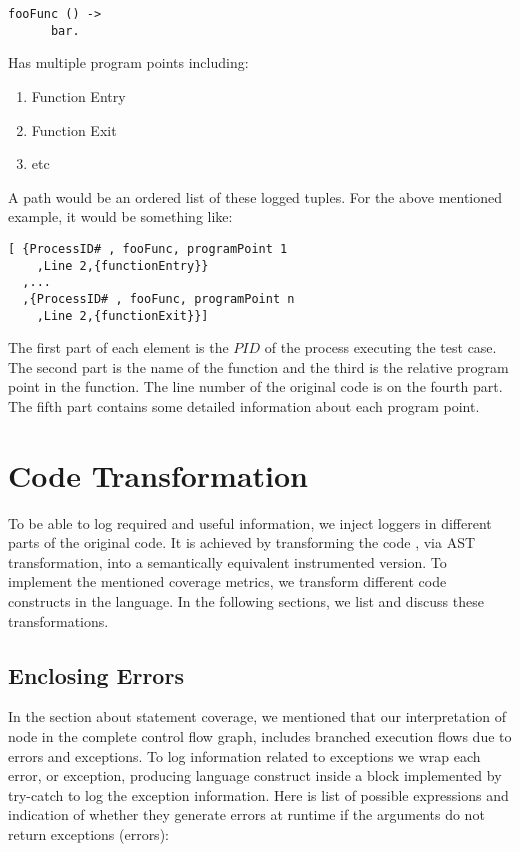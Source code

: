 \documentclass[12pt,a4paper]{report}
\begin{document}
\begin{lstlisting}
fooFunc () -> 
      bar.  
\end{lstlisting}

Has multiple program points including:

\begin{enumerate}
 \item Function Entry
 \item Function Exit
 \item etc
\end{enumerate}
 
A path would be an ordered list of these logged tuples. For the above mentioned example, it would be something like:

\begin{lstlisting}
[ {ProcessID# , fooFunc, programPoint 1
    ,Line 2,{functionEntry}}
  ,...
  ,{ProcessID# , fooFunc, programPoint n
    ,Line 2,{functionExit}}]
\end{lstlisting}

The first part of each element is the $PID$ of the process executing the test case. The second part is the name of the function and the third is the relative program point in the function. The line number of the original code is on the fourth part. The fifth part contains some detailed information about each program point.   
 
\section{Code Transformation}
To be able to log required and useful information, we inject loggers in different parts of the original code. It is achieved by transforming the code , via AST transformation, into a semantically equivalent instrumented version. To implement the mentioned coverage metrics, we transform different code constructs in the language. In the following sections, we list and discuss these transformations.

\subsection{Enclosing Errors}
In the section about statement coverage, we mentioned that our interpretation of node in the complete control flow graph, includes branched execution flows due to errors and exceptions. To log information related to exceptions we wrap each error, or exception, producing language construct inside a block implemented by try-catch to log the exception information. Here is list of possible expressions\cite{ErlangAbstractSyntax} and indication of whether they generate errors at runtime if the arguments do not return exceptions (errors):
\end{document}
